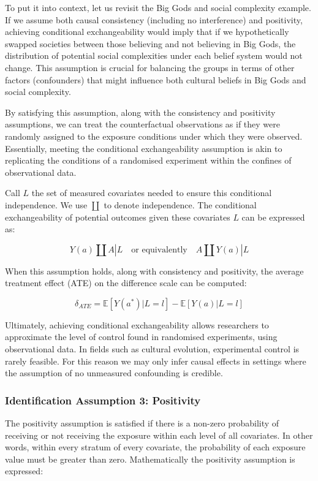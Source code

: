 \documentclass[
  singlecolumn,
  9pt]{article}
\begin{document}
To put it into context, let us revisit the Big Gods and social
complexity example. If we assume both causal consistency (including no
interference) and positivity, achieving conditional exchangeability
would imply that if we hypothetically swapped societies between those
believing and not believing in Big Gods, the distribution of potential
social complexities under each belief system would not change. This
assumption is crucial for balancing the groups in terms of other factors
(confounders) that might influence both cultural beliefs in Big Gods and
social complexity.

By satisfying this assumption, along with the consistency and positivity
assumptions, we can treat the counterfactual observations as if they
were randomly assigned to the exposure conditions under which they were
observed. Essentially, meeting the conditional exchangeability
assumption is akin to replicating the conditions of a randomised
experiment within the confines of observational data.

Call \(L\) the set of measured covariates needed to ensure this
conditional independence. We use \(\coprod\) to denote independence. The
conditional exchangeability of potential outcomes given these covariates
\(L\) can be expressed as:

\[
Y(a) \coprod  A|L \quad \text{or equivalently} \quad A \coprod  Y(a)|L
\]

When this assumption holds, along with consistency and positivity, the
average treatment effect (ATE) on the difference scale can be computed:

\[
\delta_{ATE}  = \mathbb{E}[Y(a^*)|L = l] - \mathbb{E}[Y(a)|L = l]
\]

Ultimately, achieving conditional exchangeability allows researchers to
approximate the level of control found in randomised experiments, using
observational data. In fields such as cultural evolution, experimental
control is rarely feasible. For this reason we may only infer causal
effects in settings where the assumption of no unmeasured confounding is
credible.

\subsubsection{Identification Assumption 3:
Positivity}\label{identification-assumption-3-positivity}

The positivity assumption is satisfied if there is a non-zero
probability of receiving or not receiving the exposure within each level
of all covariates. In other words, within every stratum of every
covariate, the probability of each exposure value must be greater than
zero. Mathematically the positivity assumption is expressed:
\end{document}
